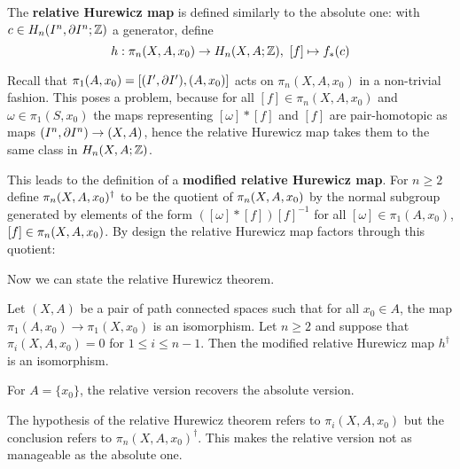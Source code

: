 The \textbf{relative Hurewicz map} is defined similarly to the absolute one: with $c\in H_n(I^n,\partial I^n;{\mathbb Z})$ a generator, define
\[h:\pi_n(X,A,x_0)\to H_n(X,A;{\mathbb Z}),\ [f]\mapsto f_*(c)\]


Recall that $\pi_1(A,x_0)=[(I',\partial I'),(A,x_0)]$ acts on $\pi_n(X,A,x_0)$ in a non-trivial fashion. This poses a problem, because for all $[f]\in\pi_n(X,A,x_0)$ and $\omega\in\pi_1(S,x_0)$ the maps representing $[\omega]*[f]$ and $[f]$ are pair-homotopic as maps $(I^n,\partial I^n)\to(X,A)$, hence the relative Hurewicz map takes them to the same class in $H_n(X,A;{\mathbb Z})$.

This leads to the definition of a \textbf{modified relative Hurewicz map}. For $n\geq2$ define $\pi_n(X,A,x_0)^\dagger$ to be the quotient of $\pi_n(X,A,x_0)$ by the normal subgroup generated by elements of the form $([\omega]*[f])[f]^{-1}$ for all $[\omega]\in\pi_1(A,x_0)$, $[f]\in\pi_n(X,A,x_0)$. By design the relative Hurewicz map factors through this quotient:
\begin{center}
\end{center}

Now we can state the relative Hurewicz theorem.

\begin{theorem}[Hurewicz]\label{theorem:hurewicz}
Let $(X,A)$ be a pair of path connected spaces such that for all $x_0\in A$, the map $\pi_1(A,x_0)\to\pi_1(X,x_0)$ is an isomorphism. Let $n\geq2$ and suppose that $\pi_i(X,A,x_0)=0$ for $1\leq i\leq n-1$. Then the modified relative Hurewicz map $h^\dagger$ is an isomorphism.
\end{theorem}

\begin{remark}
For $A=\{x_0\}$, the relative version recovers the absolute version.
\end{remark}

\begin{remark}
The hypothesis of the relative Hurewicz theorem refers to $\pi_i(X,A,x_0)$ but the conclusion refers to $\pi_n(X,A,x_0)^\dagger$. This makes the relative version not as manageable as the absolute one.
\end{remark}